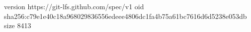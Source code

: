 version https://git-lfs.github.com/spec/v1
oid sha256:c79e1e40c18a968029836556edeee4806dc1fa4b75a61bc7616d6d5238e053db
size 8413
